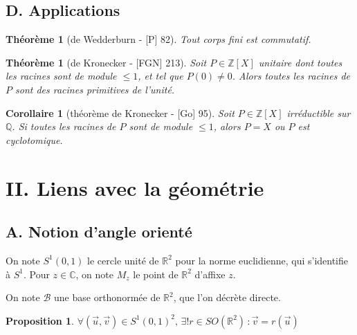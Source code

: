 \documentclass[10pt, a4paper, parskip=full, twoside, twocolumn]{report}
\newtheorem{theorem}[definition]{Théorème}
\newtheorem{proposition}[definition]{Proposition}
\newtheorem{corollary}[definition]{Corollaire}
\newcommand{\IZ}{\mathbb{Z}}
\newcommand{\IQ}{\mathbb{Q}}
\newcommand{\IC}{\mathbb{C}}
\newcommand{\IR}{\mathbb{R}}
\begin{document}
\subsection*{D. Applications}

\begin{theorem}[de Wedderburn - \textnormal{[P] 82}]
	Tout corps fini est commutatif.
\end{theorem}

\begin{tcolorbox}[
    breakable, %
    colback=developpement, %
    colframe=gray!0!black, %
    boxrule=0pt, %
    arc=1mm, %
	boxsep=0pt,
	left=0pt, right=0pt, top=0pt, bottom=0pt
]
\begin{theorem}[de Kronecker - \textnormal{[FGN] 213}]
	\label{dev11}
	Soit $P\in\IZ[X]$ unitaire dont toutes les racines sont de module $\leq 1$, et tel que 
	$P(0)\neq 0$. Alors toutes les racines de $P$ sont des racines primitives de l'unité.
\end{theorem}

\begin{corollary}[théorème de Kronecker - \textnormal{[Go] 95}]
	\label{dev12}
	Soit $P\in\IZ[X]$ irréductible sur $\IQ$. Si toutes les racines de $P$ sont 
	de module $\leq 1$, alors $P=X$ ou $P$ est cyclotomique.
\end{corollary}
\end{tcolorbox}

\section*{II. Liens avec la géométrie}
\subsection*{A. Notion d'angle orienté}
On note $S^1(0,1)$ le cercle unité de $\IR^2$ pour la norme euclidienne, qui s'identifie à 
$S^1$. Pour $z\in\IC$, on note $M_z$ le point de $\IR^2$ d'affixe $z$.

On note $\mathcal{B}$ une base orthonormée de $\IR^2$, que l'on décrète directe.

\begin{proposition}
	$\forall (\overrightarrow{u}, \overrightarrow{v}) \in S^1(0,1)^2,\, \exists ! r\in SO(\IR^2)\, : \overrightarrow{v} = r(\overrightarrow{u})$
\end{proposition}
\end{document}
